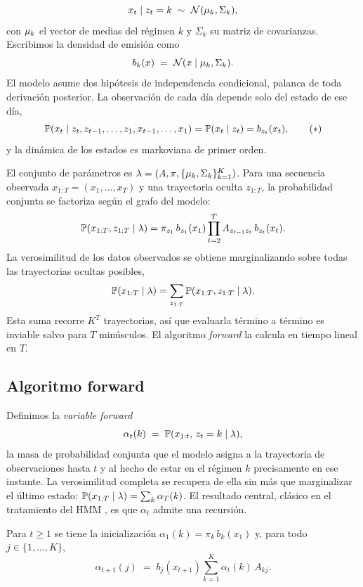 \[
x_t \mid z_t = k \;\sim\; \mathcal{N}(\mu_k, \Sigma_k),
\]
con $\mu_k$ el vector de medias del régimen $k$ y $\Sigma_k$ su matriz de covarianzas. Escribimos la densidad de emisión como
\[
b_k(x) \;=\; \mathcal{N}(x \mid \mu_k, \Sigma_k).
\]
El modelo asume dos hipótesis de independencia condicional, palanca de toda derivación posterior. La observación de cada día depende solo del estado de ese día,
\[
\mathbb{P}(x_t \mid z_t, z_{t-1}, \dots, z_1, x_{t-1}, \dots, x_1) = \mathbb{P}(x_t \mid z_t) = b_{z_t}(x_t),
\tag{$\ast$}
\]
y la dinámica de los estados es markoviana de primer orden.

El conjunto de parámetros es $\lambda = (A, \pi, \{\mu_k, \Sigma_k\}_{k=1}^{K})$. Para una secuencia observada $x_{1:T} = (x_1, \dots, x_T)$ y una trayectoria oculta $z_{1:T}$, la probabilidad conjunta se factoriza según el grafo del modelo:
\[
\mathbb{P}(x_{1:T}, z_{1:T} \mid \lambda)
= \pi_{z_1}\, b_{z_1}(x_1) \prod_{t=2}^{T} A_{z_{t-1} z_t}\, b_{z_t}(x_t).
\]
La verosimilitud de los datos observados se obtiene marginalizando sobre todas las trayectorias ocultas posibles,
\[
\mathbb{P}(x_{1:T} \mid \lambda) = \sum_{z_{1:T}} \mathbb{P}(x_{1:T}, z_{1:T} \mid \lambda).
\]
Esta suma recorre $K^T$ trayectorias, así que evaluarla término a término es inviable salvo para $T$ minúsculos. El algoritmo \emph{forward} la calcula en tiempo lineal en $T$.

\subsection{Algoritmo forward}
\label{sec:hmm-forward}

Definimos la \emph{variable forward}
\[
\alpha_t(k) \;=\; \mathbb{P}(x_{1:t},\, z_t = k \mid \lambda),
\]
la masa de probabilidad conjunta que el modelo asigna a la trayectoria de observaciones hasta $t$ y al hecho de estar en el régimen $k$ precisamente en ese instante. La verosimilitud completa se recupera de ella sin más que marginalizar el último estado: $\mathbb{P}(x_{1:T} \mid \lambda) = \sum_{k} \alpha_T(k)$. El resultado central, clásico en el tratamiento del HMM \cite{rabiner1989, bishop2006}, es que $\alpha_t$ admite una recursión.

\begin{proposicion}
\label{prop:forward}
Para $t \ge 1$ se tiene la inicialización $\alpha_1(k) = \pi_k\, b_k(x_1)$ y, para todo $j \in \{1, \dots, K\}$,
\[
\alpha_{t+1}(j) \;=\; b_j(x_{t+1}) \sum_{k=1}^{K} \alpha_t(k)\, A_{kj}.
\]
\end{proposicion}

